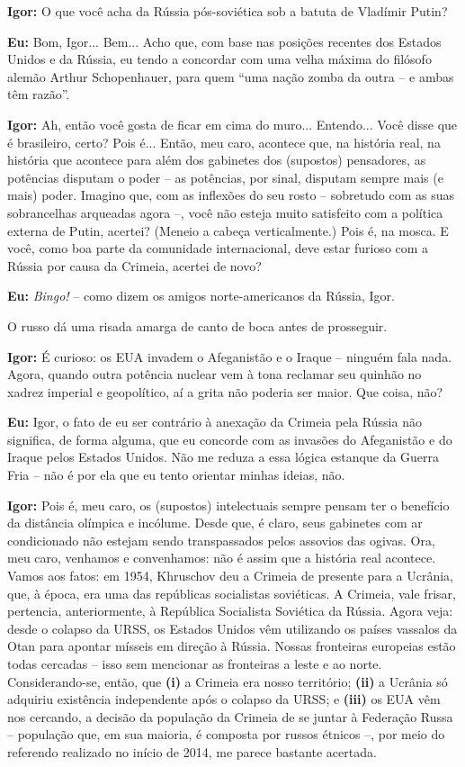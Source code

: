 \textbf{Igor:} O que você acha da Rússia pós-soviética sob a batuta de
Vladímir Putin?

\textbf{Eu:} Bom, Igor... Bem... Acho que, com base nas posições
recentes dos Estados Unidos e da Rússia, eu tendo a concordar com uma
velha máxima do filósofo alemão Arthur Schopenhauer, para quem ``uma
nação zomba da outra -- e ambas têm razão''.

\textbf{Igor:} Ah, então você gosta de ficar em cima do muro...
Entendo... Você disse que é brasileiro, certo? Pois é... Então, meu
caro, acontece que, na história real, na história que acontece para além
dos gabinetes dos (supostos) pensadores, as potências disputam o poder
-- as potências, por sinal, disputam sempre mais (e mais) poder. Imagino
que, com as inflexões do seu rosto -- sobretudo com as suas sobrancelhas
arqueadas agora --, você não esteja muito satisfeito com a política
externa de Putin, acertei? (Meneio a cabeça verticalmente.) Pois é, na
mosca. E você, como boa parte da comunidade internacional, deve estar
furioso com a Rússia por causa da Crimeia, acertei de novo?

\textbf{Eu:} \emph{Bingo!} -- como dizem os amigos norte-americanos da
Rússia, Igor.

O russo dá uma risada amarga de canto de boca antes de prosseguir.

\textbf{Igor:} É curioso: os EUA invadem o Afeganistão e o Iraque --
ninguém fala nada. Agora, quando outra potência nuclear vem à tona
reclamar seu quinhão no xadrez imperial e geopolítico, aí a grita não
poderia ser maior. Que coisa, não?

\textbf{Eu:} Igor, o fato de eu ser contrário à anexação da Crimeia pela
Rússia não significa, de forma alguma, que eu concorde com as invasões
do Afeganistão e do Iraque pelos Estados Unidos. Não me reduza a essa
lógica estanque da Guerra Fria -- não é por ela que eu tento orientar
minhas ideias, não.

\textbf{Igor:} Pois é, meu caro, os (supostos) intelectuais sempre
pensam ter o benefício da distância olímpica e incólume. Desde que, é
claro, seus gabinetes com ar condicionado não estejam sendo
transpassados pelos assovios das ogivas. Ora, meu caro, venhamos e
convenhamos: não é assim que a história real acontece. Vamos aos fatos:
em 1954, Khruschov deu a Crimeia de presente para a Ucrânia, que, à
época, era uma das repúblicas socialistas soviéticas. A Crimeia, vale
frisar, pertencia, anteriormente, à República Socialista Soviética da
Rússia. Agora veja: desde o colapso da URSS, os Estados Unidos vêm
utilizando os países vassalos da Otan para apontar mísseis em direção à
Rússia. Nossas fronteiras europeias estão todas cercadas -- isso sem
mencionar as fronteiras a leste e ao norte. Considerando-se, então, que
\textbf{(i)} a Crimeia era nosso território; \textbf{(ii)} a Ucrânia só
adquiriu existência independente após o colapso da URSS; e
\textbf{(iii)} os EUA vêm nos cercando, a decisão da população da
Crimeia de se juntar à Federação Russa -- população que, em sua maioria,
é composta por russos étnicos --, por meio do referendo realizado no
início de 2014, me parece bastante acertada.

